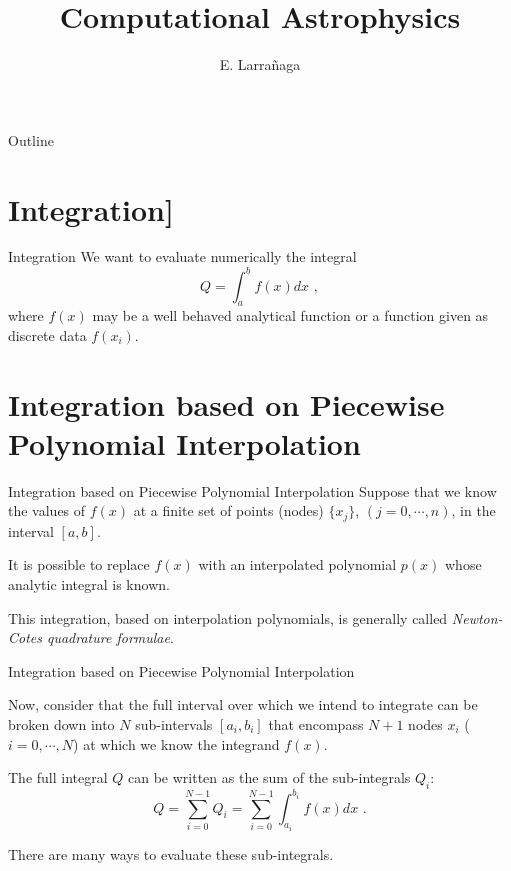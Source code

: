 \documentclass[11pt]{beamer}
\begin{document}
\begin{frame}
\title{Computational Astrophysics}
\author{E. Larrañaga}
\titlepage
\end{frame}

\begin{frame}{Outline}
\tableofcontents
\end{frame}

\section{Integration]}

\begin{frame}[fragile]{Integration}
We want to evaluate numerically the integral
\begin{equation}
Q = \int_a^b f(x) dx\,\, ,
\end{equation}
where $f(x)$ may be a well behaved analytical  function or a function given as discrete data $f(x_i)$.
\end{frame}



\section{Integration based on Piecewise Polynomial Interpolation}

\begin{frame}[fragile]{Integration based on Piecewise Polynomial Interpolation}
Suppose that we know the values of $f(x)$ at a finite set of points
(nodes) $\{x_j\}$, $(j=0,\cdots,n)$,  in the interval $[a,b]$. \\
\pause
\bigskip

It is possible to replace $f(x)$ with an interpolated polynomial $p(x)$ whose analytic
integral is known.\\
\pause
\bigskip

This integration, based on interpolation polynomials, is
generally called \textit{Newton-Cotes quadrature formulae}.
\end{frame}

\begin{frame}[fragile]{Integration based on Piecewise Polynomial Interpolation}

Now, consider that the full interval over which
we intend to integrate can be broken down into $N$ sub-intervals
$[a_i,b_i]$ that encompass $N+1$ nodes $x_i$ ($i=0,\cdots,N$) at
which we know the integrand $f(x)$.\\
\pause
\bigskip

The full integral $Q$ can be written as the sum of the sub-integrals $Q_i$:
\begin{equation}
Q = \sum_{i=0}^{N-1} Q_i = \sum_{i=0}^{N-1} \int_{a_i}^{b_i} f(x) dx\,\,.
\end{equation}
\pause

There are many ways to evaluate these sub-integrals.
\end{frame}
\end{document}
